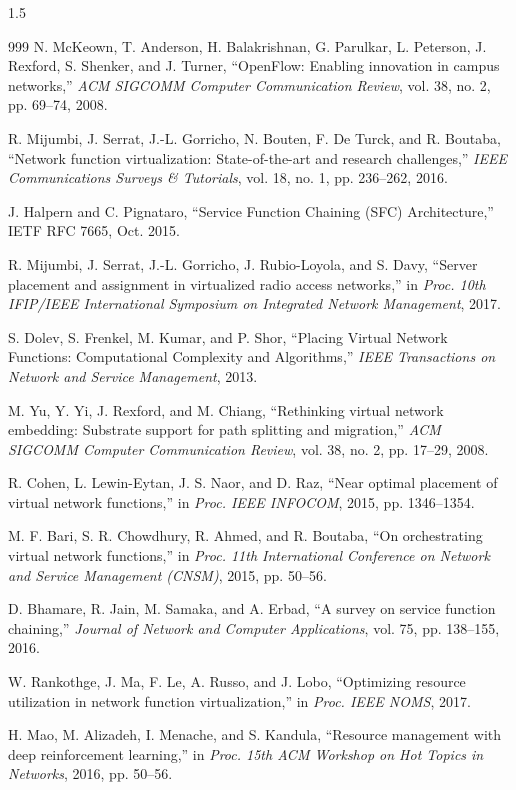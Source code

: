 \documentclass[A4paper,12pt]{report}
\theoremstyle{plain}
\theoremstyle{definition}
\theoremstyle{remark}
\numberwithin{equation}{section}
\begin{document}
\begin{spacing}{1.5}
\begin{thebibliography}{999}
N. McKeown, T. Anderson, H. Balakrishnan, G. Parulkar, L. Peterson, J. Rexford, S. Shenker, and J. Turner, ``OpenFlow: Enabling innovation in campus networks,'' \textit{ACM SIGCOMM Computer Communication Review}, vol. 38, no. 2, pp. 69--74, 2008.

R. Mijumbi, J. Serrat, J.-L. Gorricho, N. Bouten, F. De Turck, and R. Boutaba, ``Network function virtualization: State-of-the-art and research challenges,'' \textit{IEEE Communications Surveys \& Tutorials}, vol. 18, no. 1, pp. 236--262, 2016.

J. Halpern and C. Pignataro, ``Service Function Chaining (SFC) Architecture,'' IETF RFC 7665, Oct. 2015.

R. Mijumbi, J. Serrat, J.-L. Gorricho, J. Rubio-Loyola, and S. Davy, ``Server placement and assignment in virtualized radio access networks,'' in \textit{Proc. 10th IFIP/IEEE International Symposium on Integrated Network Management}, 2017.

S. Dolev, S. Frenkel, M. Kumar, and P. Shor, ``Placing Virtual Network Functions: Computational Complexity and Algorithms,'' \textit{IEEE Transactions on Network and Service Management}, 2013.

M. Yu, Y. Yi, J. Rexford, and M. Chiang, ``Rethinking virtual network embedding: Substrate support for path splitting and migration,'' \textit{ACM SIGCOMM Computer Communication Review}, vol. 38, no. 2, pp. 17--29, 2008.

R. Cohen, L. Lewin-Eytan, J. S. Naor, and D. Raz, ``Near optimal placement of virtual network functions,'' in \textit{Proc. IEEE INFOCOM}, 2015, pp. 1346--1354.

M. F. Bari, S. R. Chowdhury, R. Ahmed, and R. Boutaba, ``On orchestrating virtual network functions,'' in \textit{Proc. 11th International Conference on Network and Service Management (CNSM)}, 2015, pp. 50--56.

D. Bhamare, R. Jain, M. Samaka, and A. Erbad, ``A survey on service function chaining,'' \textit{Journal of Network and Computer Applications}, vol. 75, pp. 138--155, 2016.

W. Rankothge, J. Ma, F. Le, A. Russo, and J. Lobo, ``Optimizing resource utilization in network function virtualization,'' in \textit{Proc. IEEE NOMS}, 2017.

H. Mao, M. Alizadeh, I. Menache, and S. Kandula, ``Resource management with deep reinforcement learning,'' in \textit{Proc. 15th ACM Workshop on Hot Topics in Networks}, 2016, pp. 50--56.


\end{thebibliography}
\end{spacing}
\end{document}
